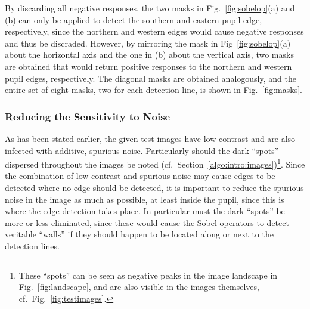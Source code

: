 By discarding all negative responses, the two masks in
Fig.~\ref{fig:sobelop}(a) and (b) can only be applied to detect the
southern and eastern pupil edge, respectively, since the northern and
western edges would cause negative responses and thus be discraded.
However, by mirroring the mask in Fig~\ref{fig:sobelop}(a) about the
horizontal axis and the one in (b) about the vertical axis, two masks
are obtained that would return positive responses to the northern and
western pupil edges, respectively.  The diagonal masks are obtained
analogously, and the entire set of eight masks, two for each detection
line, is shown in Fig.~\ref{fig:masks}.

\subsubsection{Reducing the Sensitivity to Noise}


As has been stated earlier, the given test images have low contrast
and are also infected with additive, spurious noise.  Particularly
should the dark ``spots'' dispersed throughout the images be noted
(cf.\ Section~\ref{algo:intro:images})\footnote{These ``spots'' can be
  seen as negative peaks in the image landscape in
  Fig.~\ref{fig:landscape}, and are also visible in the images
  themselves, cf.\ Fig.~\ref{fig:testimages}.}.  Since the combination
of low contrast and spurious noise may cause edges to be detected
where no edge should be detected, it is important to reduce the
spurious noise in the image as much as possible, at least inside the
pupil, since this is where the edge detection takes place.
In particular must the dark ``spots'' be more or less eliminated,
since these would cause the Sobel operators to detect veritable
``walls'' if they should happen to be located along or next to the
detection lines.

